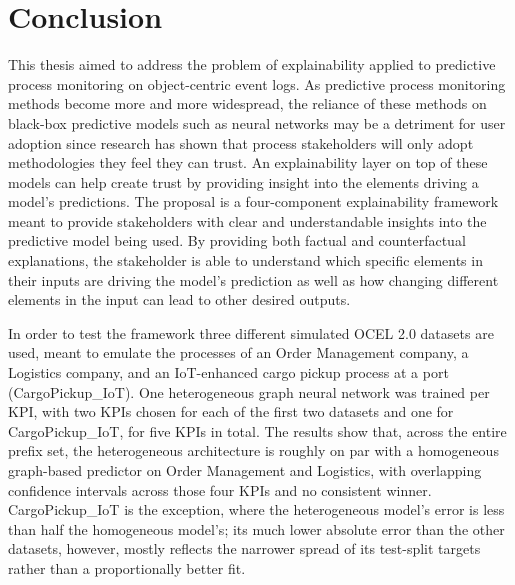 
\chapter{Conclusion}
\label{chp:conclusion}

This thesis aimed to address the problem of explainability applied to predictive process monitoring on object-centric event logs. As predictive process monitoring methods become more and more widespread, the reliance of these methods on black-box predictive models such as neural networks may be a detriment for user adoption since research has shown that process stakeholders will only adopt methodologies they feel they can trust. An explainability layer on top of these models can help create trust by providing insight into the elements driving a model's predictions. The proposal is a four-component explainability framework meant to provide stakeholders with clear and understandable insights into the predictive model being used. By providing both factual and counterfactual explanations, the stakeholder is able to understand which specific elements in their inputs are driving the model's prediction as well as how changing different elements in the input can lead to other desired outputs.


In order to test the framework three different simulated OCEL 2.0 datasets are used, meant to emulate the processes of an Order Management company, a Logistics company, and an IoT-enhanced cargo pickup process at a port (CargoPickup\_IoT). One heterogeneous graph neural network was trained per KPI, with two KPIs chosen for each of the first two datasets and one for CargoPickup\_IoT, for five KPIs in total. The results show that, across the entire prefix set, the heterogeneous architecture is roughly on par with a homogeneous graph-based predictor on Order Management and Logistics, with overlapping confidence intervals across those four KPIs and no consistent winner. CargoPickup\_IoT is the exception, where the heterogeneous model's error is less than half the homogeneous model's; its much lower absolute error than the other datasets, however, mostly reflects the narrower spread of its test-split targets rather than a proportionally better fit.


